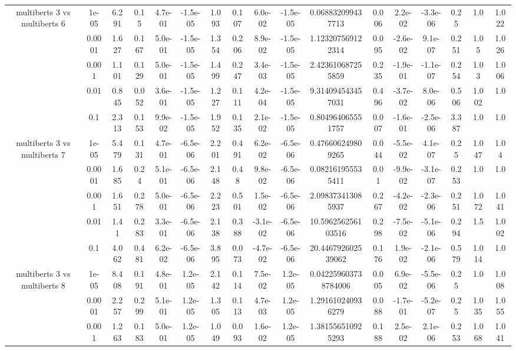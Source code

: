\begin{tabular}{|c|c|c|c|c|c|c|c|c|c|c|c|c|c|c|c|c|}
\hline
\multirow{5}{*}{multiberts 3 vs multiberts 6} & 1e-05 & 6.291 & 0.15 & 4.7e-01 & -1.5e-05 & 1.093 & 0.107 & 6.0e-02 & -1.5e-05 & 0.068832099437713 & 0.006 & 2.2e-02 & -3.3e-06 & 0.25 & 1.0 & 1.022 \\
 & 0.0001 & 1.627 & 0.167 & 5.0e-01 & -1.5e-05 & 1.354 & 0.206 & 8.9e-02 & -1.5e-05 & 1.123207569122314 & 0.095 & -2.6e-02 & 9.1e-07 & 0.251 & 1.05 & 1.026 \\
 & 0.001 & 1.101 & 0.129 & 5.0e-01 & -1.5e-05 & 1.499 & 0.247 & 3.4e-03 & -1.5e-05 & 2.423610687255859 & 0.235 & -1.9e-01 & -1.1e-07 & 0.254 & 1.03 & 1.006 \\
 & 0.01 & 0.845 & 0.052 & 3.6e-01 & -1.5e-05 & 1.227 & 0.111 & 4.2e-04 & -1.5e-05 & 9.314094543457031 & 0.496 & -3.7e-02 & 8.0e-06 & 0.506 & 1.002 & 1.0 \\
 & 0.1 & 2.313 & 0.153 & 9.9e-02 & -1.5e-05 & 1.952 & 0.135 & 2.1e-02 & -1.5e-05 & 0.804964065551757 & 0.007 & -1.6e-01 & -2.5e-06 & 3.387 & 1.0 & 1.0 \\
\hline
\multirow{5}{*}{multiberts 3 vs multiberts 7} & 1e-05 & 5.479 & 0.131 & 4.7e-01 & -6.5e-06 & 2.201 & 0.491 & 6.2e-02 & -6.5e-06 & 0.476606249809265 & 0.044 & -5.5e-02 & 4.1e-07 & 0.25 & 1.047 & 1.04 \\
 & 0.0001 & 1.685 & 0.24 & 5.1e-01 & -6.5e-06 & 2.148 & 0.48 & 9.8e-02 & -6.5e-06 & 0.082161955535411 & 0.01 & -9.9e-02 & -3.1e-07 & 0.253 & 1.0 & 1.0 \\
 & 0.001 & 1.651 & 0.278 & 5.0e-01 & -6.5e-06 & 2.223 & 0.501 & 1.5e-02 & -6.5e-06 & 2.098373413085937 & 0.267 & -4.2e-02 & -2.3e-06 & 0.251 & 1.072 & 1.041 \\
 & 0.01 & 1.41 & 0.283 & 3.3e-01 & -6.5e-06 & 2.138 & 0.388 & -3.1e-02 & -6.5e-06 & 10.596256256103516 & 0.298 & -7.5e-02 & -5.1e-06 & 0.294 & 1.5 & 1.002 \\
 & 0.1 & 4.062 & 0.481 & 6.2e-02 & -6.5e-06 & 3.895 & 0.073 & -4.7e-02 & -6.5e-06 & 20.446792602539062 & 0.176 & 1.9e-02 & -2.1e-06 & 0.579 & 1.014 & 1.0 \\
\hline
\multirow{5}{*}{multiberts 3 vs multiberts 8} & 1e-05 & 8.408 & 0.191 & 4.8e-01 & 1.2e-05 & 2.142 & 0.114 & 7.5e-02 & 1.2e-05 & 0.042259603738784006 & 0.005 & 6.9e-02 & -5.5e-06 & 0.25 & 1.0 & 1.008 \\
 & 0.0001 & 2.257 & 0.299 & 5.1e-01 & 1.2e-05 & 1.305 & 0.113 & 4.7e-03 & 1.2e-05 & 1.291610240936279 & 0.088 & -1.7e-01 & -5.2e-07 & 0.25 & 1.035 & 1.055 \\
 & 0.001 & 1.263 & 0.183 & 5.0e-01 & 1.2e-05 & 1.049 & 0.093 & 1.6e-02 & 1.2e-05 & 1.381556510925293 & 0.188 & 2.5e-02 & 2.1e-06 & 0.253 & 1.068 & 1.041 \\

\end{tabular}
